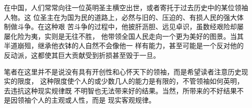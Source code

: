
在中国，人们常常向往一位英明圣主横空出世，或者寄托于过去历史中的某位领袖人物。这
位圣主在为国为民的道路上，必然与旧的、压迫的、有损人民的强大体制做斗争。在这种艰
苦斗争的过程中，他披肝沥胆、远见卓识，虽数经艰险却屡屡化险为夷，实则是无往不胜，
他带领全国人民走向一个更为美好的图景。当其半道崩殂，继承他衣钵的人自然不会像他一
样有能力，甚至可能是一个反对他的反动派，这都使其巨大贡献受到折损甚至毁于一旦。

笔者在这里并不是说没有具有开创性和心怀天下的领袖，而是希望读者注意历史现实的限度，
这种限度使个人的或少数几人的能力是有限的，不管领袖如何英明，去违抗这种现实规律既
不明智也无法带来好的结果。当然，所带来的不好结果不是因领袖个人的主观或人性，而是
现实客观规律。

